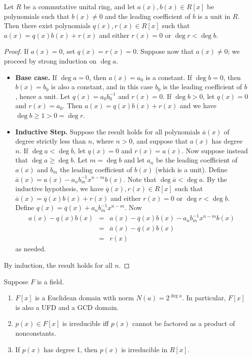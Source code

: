 \documentclass{article}
\begin{document}

\begin{prop}
Let $R$ be a commutative unital ring, and let $a(x), b(x) \in R[x]$ be polynomials such that $b(x) \neq 0$ and the leading coefficient of $b$ is a unit in $R$. Then there exist polynomials $q(x), r(x) \in R[x]$ such that $a(x) = q(x)b(x) + r(x)$ and either $r(x) = 0$ or $\deg{r} < \deg{b}$.
\end{prop}

\begin{proof}
If $a(x) = 0$, set $q(x) = r(x) = 0$. Suppose now that $a(x) \neq 0$; we proceed by strong induction on $\deg{a}$.
\begin{itemize}
\item \textbf{Base case.} If $\deg{a} = 0$, then $a(x) = a_0$ is a constant. If $\deg{b} = 0$, then $b(x) = b_0$ is also a constant, and in this case $b_0$ is the leading coefficient of $b$, hence a unit. Let $q(x) = a_0b_0^{-1}$ and $r(x) = 0$. If $\deg{b} > 0$, let $q(x) = 0$ and $r(x) = a_0$. Then $a(x) = q(x)b(x) + r(x)$ and we have $\deg{b} \geq 1 > 0 = \deg{r}$.
\item \textbf{Inductive Step.} Suppose the result holds for all polynomials $\overline{a}(x)$ of degree strictly less than $n$, where $n > 0$, and suppose that $a(x)$ has degree $n$. If $\deg{a} < \deg{b}$, let $q(x) = 0$ and $r(x) = a(x)$. Now suppose instead that $\deg{a} \geq \deg{b}$. Let $m = \deg{b}$ and let $a_n$ be the leading coefficient of $a(x)$ and $b_m$ the leading coefficient of $b(x)$ (which is a unit). Define $\overline{a}(x) = a(x) - a_nb_m^{-1}x^{n-m}b(x)$. Note that $\deg{\overline{a}} < \deg{a}$. By the inductive hypothesis, we have $\overline{q}(x), r(x) \in R[x]$ such that $\overline{a}(x) = \overline{q}(x)b(x) + r(x)$ and either $r(x) = 0$ or $\deg{r} < \deg{b}$. Define $q(x) = \overline{q}(x) + a_nb_m^{-1}x^{n-m}$. Now 
\begin{eqnarray*}
a(x) - q(x)b(x) & = & a(x) - \overline{q}(x)b(x) - a_nb_m^{-1}x^{n-m}b(x) \\
 & = & \overline{a}(x) - \overline{q}(x)b(x) \\
 & = & r(x)
\end{eqnarray*}
as needed.
\end{itemize}
By induction, the result holds for all $n$.
\end{proof}

\begin{cor}
Suppose $F$ is a field.
\begin{enumerate}
\item $F[x]$ is a Euclidean domain with norm $N(a) = 2^{\deg{a}}$. In particular, $F[x]$ is also a UFD and a GCD domain.
\item $p(x) \in F[x]$ is irreducible iff $p(x)$ cannot be factored as a product of nonconstants.
\item If $p(x)$ has degree 1, then $p(x)$ is irreducible in $R[x]$.
\end{enumerate}
\end{cor}
\end{document}
